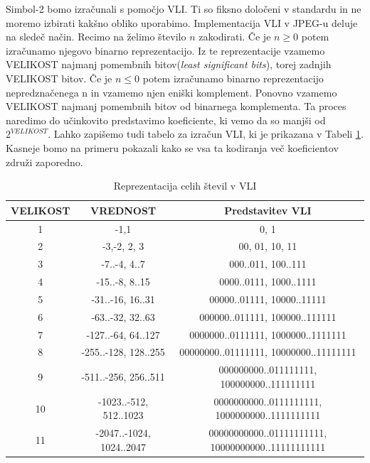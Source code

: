 \documentclass[a4paper,12pt,openright]{book}
\begin{document}
Simbol-2 bomo izračunali s pomočjo VLI. Ti so fiksno določeni v standardu in ne moremo izbirati kakšno obliko uporabimo. Implementacija VLI v JPEG-u deluje na sledeč način. Recimo na želimo število \(n\) zakodirati. Če je \(n \geq 0\) potem izračunamo njegovo binarno reprezentacijo. Iz te reprezentacije vzamemo VELIKOST najmanj pomembnih bitov(\textit{least significant bits}), torej zadnjih VELIKOST bitov. Če je \(n \leq 0\) potem izračunamo binarno reprezentacijo nepredznačenega n in vzamemo njen eniški komplement. Ponovno vzamemo VELIKOST najmanj pomembnih bitov od binarnega komplementa. Ta proces naredimo do učinkovito predstavimo koeficiente, ki vemo da so manjši od \(2^{VELIKOST}\). Lahko zapišemo tudi tabelo za izračun VLI, ki je prikazana v Tabeli \ref{tab:VLI_tabela}. Kasneje bomo na primeru pokazali kako se vsa ta kodiranja več koeficientov združi zaporedno.
\begin{table}[ht]
\centering
\begin{tabular}{|c|c|c|}
\hline
VELIKOST& VREDNOST& Predstavitev VLI\\
\hline
1  & -1,1 &0, 1\\
2  & -3,-2, 2, 3 &00, 01, 10, 11\\
3  & -7..-4, 4..7 &000..011, 100..111\\
4  & -15..-8, 8..15 &0000..0111, 1000..1111\\
5  & -31..-16, 16..31 &00000..01111, 10000..11111\\
6  & -63..-32, 32..63 &000000..011111, 100000..111111\\
7  & -127..-64, 64..127 &0000000..0111111, 1000000..1111111\\
8  & -255..-128, 128..255 &00000000..01111111, 10000000..11111111\\
9  & -511..-256, 256..511 &000000000..011111111, 100000000..111111111\\
10 & -1023..-512, 512..1023 &0000000000..0111111111, 1000000000..1111111111\\
11 & -2047..-1024, 1024..2047 &00000000000..01111111111, 10000000000..11111111111\\
\hline
\end{tabular}
\caption{Reprezentacija celih števil v VLI}
\label{tab:VLI_tabela}
\end{table}
\end{document}
